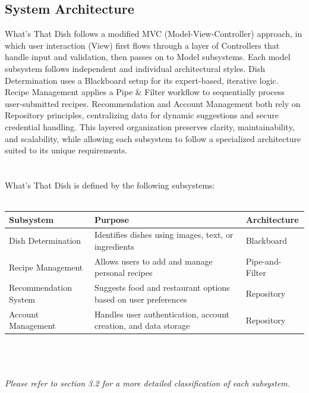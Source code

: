\documentclass[]{article}
\begin{document}
\subsection{System Architecture}
\label{sub:system_architecture}
What’s That Dish follows a modified MVC (Model-View-Controller) approach, in which user interaction (View) first flows through a layer of Controllers that handle input and validation, then passes on to Model subsystems. Each model subsystem follows independent and individual architectural styles. Dish Determination uses a Blackboard setup for its expert-based, iterative logic. Recipe Management applies a Pipe \& Filter workflow to sequentially process user‐submitted recipes. Recommendation and Account Management both rely on Repository principles, centralizing data for dynamic suggestions and secure credential handling. This layered organization preserves clarity, maintainability, and scalability, while allowing each subsystem to follow a specialized architecture suited to its unique requirements.
\\
\\
\\
What’s That Dish is defined by the following subsystems: 
\\
\\
\begin{tabularx}{1.0\textwidth} { 
  | >{\centering\arraybackslash}X 
  | >{\centering\arraybackslash}X 
  | >{\centering\arraybackslash}X | }
 \hline
 \textbf{Subsystem} & \textbf{Purpose} & \textbf{Architecture} \\
 \hline
 Dish Determination  & Identifies dishes using images, text, or ingredients  & Blackboard  \\
\hline
 Recipe Management  & Allows users to add and manage personal recipes  & Pipe-and-Filter  \\
\hline
 Recommendation System  & Suggests food and restaurant options based on user preferences  & Repository  \\
\hline
 Account Management  & Handles user authentication, account creation, and data storage  & Repository  \\
\hline

\end{tabularx}
\\
\\
\\
\textit{Please refer to section 3.2 for a more detailed classification of each subsystem.}
\\
\\
\end{document}
